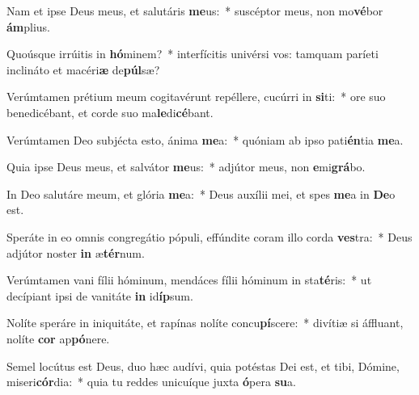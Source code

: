 \item Nam et ipse Deus meus, et salutáris \textbf{me}us:~* suscéptor meus, non mo\textbf{vé}bor \textbf{ám}plius.
\item Quoúsque irrúitis in \textbf{hó}minem?~* interfícitis univérsi vos: tamquam paríeti inclináto et macéri\textbf{æ} de\textbf{púl}sæ?
\item Verúmtamen prétium meum cogitavérunt repéllere, cucúrri in \textbf{si}ti:~* ore suo benedicébant, et corde suo ma\textbf{le}di\textbf{cé}bant.
\item Verúmtamen Deo subjécta esto, ánima \textbf{me}a:~* quóniam ab ipso pati\textbf{én}tia \textbf{me}a.
\item Quia ipse Deus meus, et salvátor \textbf{me}us:~* adjútor meus, non \textbf{e}mi\textbf{grá}bo.
\item In Deo salutáre meum, et glória \textbf{me}a:~* Deus auxílii mei, et spes \textbf{me}a in \textbf{De}o est.
\item Speráte in eo omnis congregátio pópuli, effúndite coram illo corda \textbf{ves}tra:~* Deus adjútor noster \textbf{in} æ\textbf{tér}num.
\item Verúmtamen vani fílii hóminum, mendáces fílii hóminum in sta\textbf{té}ris:~* ut decípiant ipsi de vanitáte \textbf{in} id\textbf{íp}sum.
\item Nolíte speráre in iniquitáte, et rapínas nolíte concu\textbf{pí}scere:~* divítiæ si áffluant, nolíte \textbf{cor} ap\textbf{pó}nere.
\item Semel locútus est Deus, duo hæc audívi, quia potéstas Dei est, et tibi, Dómine, miseri\textbf{cór}dia:~* quia tu reddes unicuíque juxta \textbf{ó}pera \textbf{su}a.
